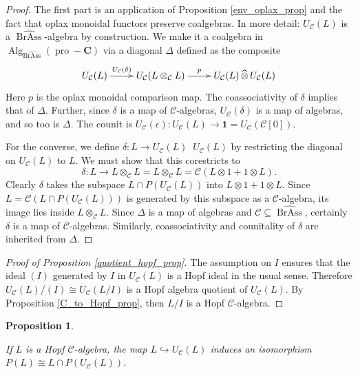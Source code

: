 \documentclass[12pt]{article}
\DeclareMathOperator{\Alg}{Alg}
\DeclareMathOperator{\pro}{pro}
\DeclareMathOperator{\BrAss}{BrAss}
\DeclareMathOperator{\hattimes}{\widehat{\otimes}}
\newcommand{\BrAsshat}{\widehat{\BrAss}} %
\newcommand{\CC} {\mathcal{C}}
\newcommand{\bC} {\mathbf{C}}
\newcommand{\one} {\mathbf{1}}
\newcommand{\proC}{\pro\!-\bC}
\theoremstyle{plain}
\newtheorem{prop}[thm]{Proposition}
\theoremstyle{definition}
\theoremstyle{remark}
\begin{document}
\begin{proof}

The first part is an application of Proposition \ref{env_oplax_prop} and the fact that oplax monoidal functors preserve coalgebras.  In more detail: $U_{\CC}(L)$ is a $\BrAsshat$-algebra by construction.  We make it a coalgebra in $\Alg_{\BrAsshat}(\proC)$ via a diagonal $\Delta$ defined as the composite
%
$$\xymatrix{U_{\CC}(L) \ar[r]^-{U_{\CC}(\delta)} & U_{\CC}(L \otimes_{\CC} L) \ar[r]^-p & U_{\CC}(L) \hattimes U_{\CC}(L)}$$
%
Here $p$ is the oplax monoidal comparison map.  The coassociativity of $\delta$ implies that of $\Delta$.  Further, since $\delta$ is a map of $\CC$-algebras, $U_{\CC}(\delta)$ is a map of algebras, and so too is $\Delta$.  The counit is $U_{\CC}(\epsilon): U_{\CC}(L) \to \one = U_{\CC}(\CC[0])$.

For the converse, we define $\delta: L \to U_{\CC}(L) \hattimes U_{\CC}(L)$ by restricting the diagonal on $U_{\CC}(L)$ to $L$.  We must show that this corestricts to 
%
$$\delta: L \to L \otimes_{\CC} L = L \otimes_{\CC} L = \CC(L \otimes 1 + 1 \otimes L).$$
%
Clearly $\delta$ takes the subspace $L \cap P(U_{\CC}(L))$ into $L \otimes 1 + 1 \otimes L$.  Since $L = \CC(L \cap P(U_{\CC}(L)))$ is generated by this subspace as a $\CC$-algebra, its image lies inside $L \otimes_{\CC} L$.  Since $\Delta$ is a map of algebras and $\CC \subseteq \BrAsshat$, certainly $\delta$ is a map of $\CC$-algebras.  Similarly, coassociativity and counitality of $\delta$ are inherited from $\Delta$.

\end{proof}


\begin{proof}[Proof of Proposition \ref{quotient_hopf_prop}]

The assumption on $I$ ensures that the ideal $(I)$ generated by $I$ in $U_{\CC}(L)$ is a Hopf ideal in the usual sense.  Therefore $U_{\CC}(L)/(I) \cong U_{\CC}(L/I)$ is a Hopf algebra quotient of $U_{\CC}(L)$.  By Proposition \ref{C_to_Hopf_prop}, then $L/I$ is a Hopf $\CC$-algebra. 

\end{proof}

\begin{prop} \label{prim_prim_prop}

If $L$ is a Hopf $\CC$-algebra, the map $L \hookrightarrow U_{\CC}(L)$ induces an isomorphism $P(L) \cong L \cap P(U_{\CC}(L))$.

\end{prop}
\end{document}
